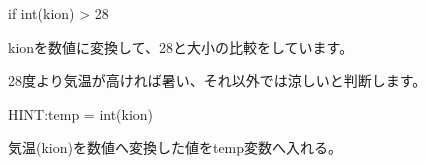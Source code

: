 \documentclass[text08.tex]{subfiles}
\begin{document}
if int(kion) {\textgreater} 28

kionを数値に変換して、28と大小の比較をしています。

28度より気温が高ければ暑い、それ以外では涼しいと判断します。


\begin{tcolorbox}[title=\useOmetoi,breakable]\label{Q:amedas4}
  \begin{enumerate}
    HINT:temp = int(kion)
    
    気温(kion)を数値へ変換した値をtemp変数へ入れる。
  \end{enumerate}
\end{tcolorbox}




\begin{tcolorbox}[title=\useOmetoi,breakable]\label{Q:amedas5}
  \begin{enumerate}
  \end{enumerate}
\end{tcolorbox}


\clearpage

\begin{tcolorbox}[title=\useOmetoi,breakable]\label{Q:amedas6}
  \begin{enumerate}
  \end{enumerate}
\end{tcolorbox}
\end{document}
